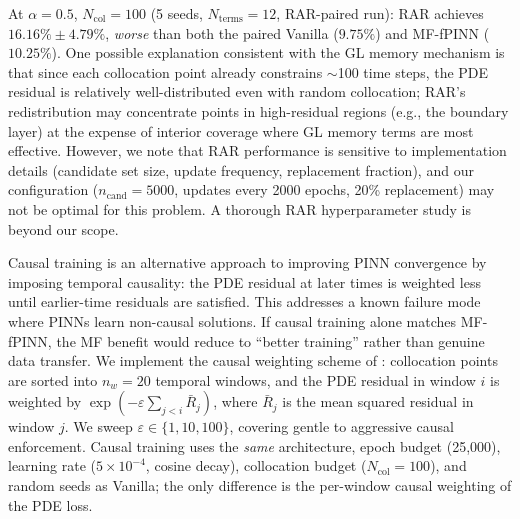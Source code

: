 \documentclass[11pt]{article}
\newcommand{\Ncol}{N_{\mathrm{col}}}
\begin{document}
At $\alpha = 0.5$, $\Ncol = 100$ (5 seeds, $N_{\mathrm{terms}} = 12$, RAR-paired run): RAR achieves $16.16\% \pm 4.79\%$, \emph{worse} than both the paired Vanilla ($9.75\%$) and MF-fPINN ($10.25\%$). One possible explanation consistent with the GL memory mechanism is that since each collocation point already constrains $\sim$100 time steps, the PDE residual is relatively well-distributed even with random collocation; RAR's redistribution may concentrate points in high-residual regions (e.g., the boundary layer) at the expense of interior coverage where GL memory terms are most effective. However, we note that RAR performance is sensitive to implementation details (candidate set size, update frequency, replacement fraction), and our configuration ($n_{\mathrm{cand}} = 5000$, updates every 2000 epochs, 20\% replacement) may not be optimal for this problem. A thorough RAR hyperparameter study is beyond our scope.

Causal training \cite{wang2022respecting} is an alternative approach to improving PINN convergence by imposing temporal causality: the PDE residual at later times is weighted less until earlier-time residuals are satisfied. This addresses a known failure mode where PINNs learn non-causal solutions. If causal training alone matches MF-fPINN, the MF benefit would reduce to ``better training'' rather than genuine data transfer. We implement the causal weighting scheme of \cite{wang2022respecting}: collocation points are sorted into $n_w = 20$ temporal windows, and the PDE residual in window $i$ is weighted by $\exp(-\varepsilon \sum_{j<i} \bar{R}_j)$, where $\bar{R}_j$ is the mean squared residual in window $j$. We sweep $\varepsilon \in \{1, 10, 100\}$, covering gentle to aggressive causal enforcement. Causal training uses the \emph{same} architecture, epoch budget (25{,}000), learning rate ($5 \times 10^{-4}$, cosine decay), collocation budget ($\Ncol = 100$), and random seeds as Vanilla; the only difference is the per-window causal weighting of the PDE loss.
\end{document}
